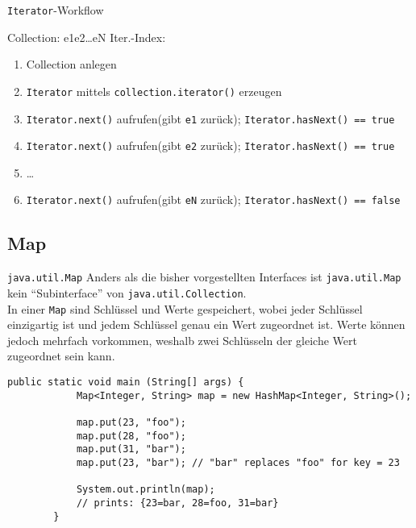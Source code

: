 \begin{frame}[fragile]{\texttt{Iterator}-Workflow}
    \begin{semiverbatim}
         Collection: \indent e1\indent e2\indent \dots\indent eN
        Iter.-Index: \onslide<2>{\textasciicircum} \indent {} \indent {} \indent{} \indent {}
    \end{semiverbatim}
    \begin{enumerate}[<+->]
        \item Collection anlegen
        \item \texttt{Iterator} mittels \texttt{collection.iterator()} erzeugen
        \item \texttt{Iterator.next()} aufrufen(gibt \texttt{e1} zurück); \texttt{Iterator.hasNext() == true}
        \item \texttt{Iterator.next()} aufrufen(gibt \texttt{e2} zurück); \texttt{Iterator.hasNext() == true}
        \item \dots
        \item \texttt{Iterator.next()} aufrufen(gibt \texttt{eN} zurück); \texttt{Iterator.hasNext() == false}
    \end{enumerate}
\end{frame}

\subsection{Map}
\begin{frame}[fragile]{\texttt{java.util.Map}}
    Anders als die bisher vorgestellten Interfaces ist \texttt{java.util.Map} kein \enquote{Subinterface} von \texttt{java.util.Collection}. \\
    In einer \texttt{Map} sind Schlüssel und Werte gespeichert, wobei jeder Schlüssel einzigartig ist und jedem Schlüssel genau ein Wert zugeordnet ist.
    Werte können jedoch mehrfach vorkommen, weshalb zwei Schlüsseln der gleiche Wert zugeordnet sein kann.
    \begin{lstlisting}[gobble=8]
        public static void main (String[] args) {
            Map<Integer, String> map = new HashMap<Integer, String>();

            map.put(23, "foo");
            map.put(28, "foo");
            map.put(31, "bar");
            map.put(23, "bar"); // "bar" replaces "foo" for key = 23

            System.out.println(map);
            // prints: {23=bar, 28=foo, 31=bar}
        }
    \end{lstlisting}
\end{frame}

